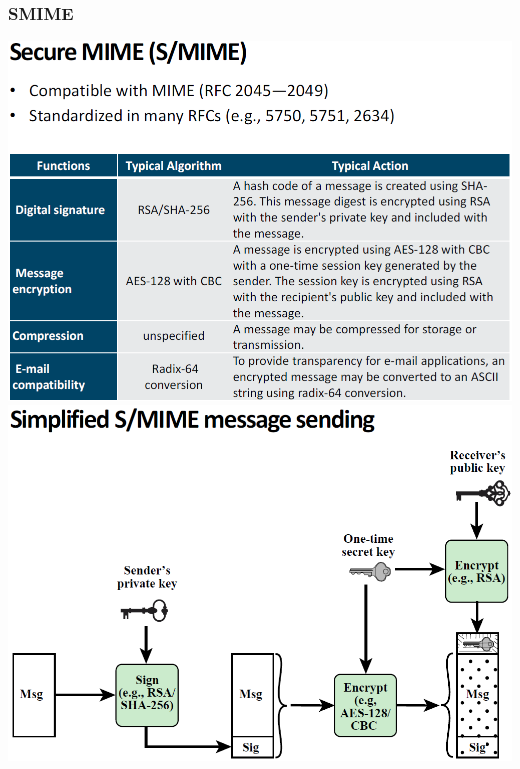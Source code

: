 \documentclass[12pt]{article}
\begin{document}
 \subsubsection{SMIME}
 \includegraphics[width=0.8\linewidth]{./slides/L8P1SMIME.PNG}\\
 \includegraphics[width=0.9\linewidth]{./slides/L8P1sSMIME.PNG}
\end{document}
